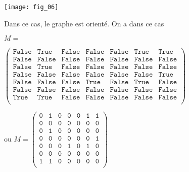 \begin{exemple}
\begin{minipage}[b]{.47\linewidth}
\end{minipage}\hfill
\begin{minipage}[b]{.47\linewidth}
\begin{center}
\texttt{[image: fig\_06]}
\end{center}
Dans ce cas, le graphe est orienté.
On a dans ce cas 

\footnotesize{$
M = $

$
\begin{pmatrix}
\texttt{False} & \texttt{True} & \texttt{False} & \texttt{False} & \texttt{False} & \texttt{True} & \texttt{True} \\
\texttt{False} & \texttt{False} & \texttt{False} & \texttt{False} & \texttt{False} & \texttt{False} & \texttt{False} \\ 
\texttt{False} & \texttt{True} & \texttt{False} & \texttt{False} & \texttt{False} & \texttt{False} & \texttt{False} \\
\texttt{False} & \texttt{False} & \texttt{False} & \texttt{False} & \texttt{False} & \texttt{False} & \texttt{True} \\
\texttt{False} & \texttt{False} & \texttt{False} & \texttt{True} & \texttt{False} & \texttt{True} & \texttt{False} \\
\texttt{False} & \texttt{False} & \texttt{False} & \texttt{False} & \texttt{False} & \texttt{False} & \texttt{False} \\
\texttt{True} & \texttt{True} & \texttt{False} & \texttt{False} & \texttt{False} & \texttt{False} & \texttt{False} \\
\end{pmatrix}$}

ou 
\footnotesize{$
M =
\begin{pmatrix}
\texttt{0} & \texttt{1} & \texttt{0} & \texttt{0} & \texttt{0} & \texttt{1} & \texttt{1} \\
\texttt{0} & \texttt{0} & \texttt{0} & \texttt{0} & \texttt{0} & \texttt{0} & \texttt{0} \\ 
\texttt{0} & \texttt{1} & \texttt{0} & \texttt{0} & \texttt{0} & \texttt{0} & \texttt{0} \\
\texttt{0} & \texttt{0} & \texttt{0} & \texttt{0} & \texttt{0} & \texttt{0} & \texttt{1} \\
\texttt{0} & \texttt{0} & \texttt{0} & \texttt{1} & \texttt{0} & \texttt{1} & \texttt{0} \\
\texttt{0} & \texttt{0} & \texttt{0} & \texttt{0} & \texttt{0} & \texttt{0} & \texttt{0} \\
\texttt{1} & \texttt{1} & \texttt{0} & \texttt{0} & \texttt{0} & \texttt{0} & \texttt{0} \\
\end{pmatrix}$}

\end{minipage}
\end{exemple}


